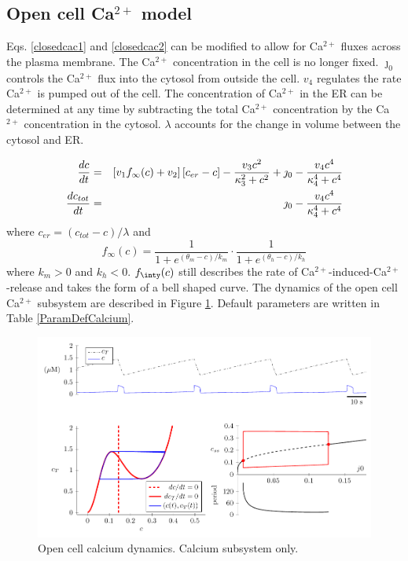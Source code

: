 \documentclass[12pt]{article}
\def\ca{Ca$^{2+}$\xspace}
\def\ctot{c_{tot}}
\def\cer{c_{er}}
\def\finf{f_\infty}
\def\thetam{\theta_m}
\def\km{k_m}
\def\thetah{\theta_h}
\def\kh{k_h}
\begin{document}
\clearpage
\subsection*{Open cell Ca$^{2+}$ model} 

Eqs. \ref{closedcac1} and \ref{closedcac2} can be modified to allow for \ca fluxes across the plasma membrane. The \ca concentration in the cell is no longer fixed. $\jmath_0$ controls the \ca flux into the cytosol from outside the cell. $v_4$ regulates the rate \ca is pumped out of the cell. The concentration of \ca in the ER can be determined at any time by subtracting the total \ca concentration by the \ca concentration in the cytosol. $\lambda$ accounts for the change in volume between the cytosol and ER. 

\begin{eqnarray*}
  \ddt{c} &=&  \left[ v_1 \finf(c) + v_2 \right] [\cer - c ] - \frac{v_3 c^2 }{\kappa_3^2 + c^2} + \jmath_0    -  \frac{v_4 c^4}{\kappa_4^4+c^4} \\
 \ddt{\ctot} &=& \jmath_0  -   \frac{v_4 c^4}{\kappa_4^4+c^4}
\end{eqnarray*}
where  $\cer = (\ctot-c)/\lambda$ and 
\begin{equation}
\finf(c) =  \frac{1}{1+e^{(\thetam-c)/\km}} \cdot  \frac{1}{1+e^{(\thetah-c)/\kh}}  \nonumber 
\end{equation}
where $\km>0$ and $\kh<0$. $f_\inty(c)$ still describes the rate of \ca-induced-\ca-release and takes the form of a bell shaped curve. The dynamics of the open cell \ca subsystem are described in Figure \ref{opencamodel}. Default parameters are written in Table \ref{ParamDefCalcium}.

\begin{figure}[h!]
    \centering
    \includegraphics{Fig03CalciumOpenCellModel.pdf}
    \caption{Open cell calcium dynamics. Calcium subsystem only.}
    \label{opencamodel}
\end{figure}
\end{document}
